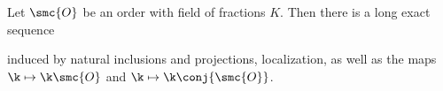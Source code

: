 \documentclass[12pt]{article}
\begin{document}
      \begin{proposition}\label{prop:long_exact_sequence_orders}
        Let \(\smc{O}\) be an order with field of fractions \(K\). Then there is a long exact sequence
        \begin{center}
        \end{center}
        induced by natural inclusions and projections, localization, as well as the maps \(\k \mapsto \k\smc{O}\) and \(\k \mapsto \k\conj{\smc{O}}\).
      \end{proposition}
\end{document}
